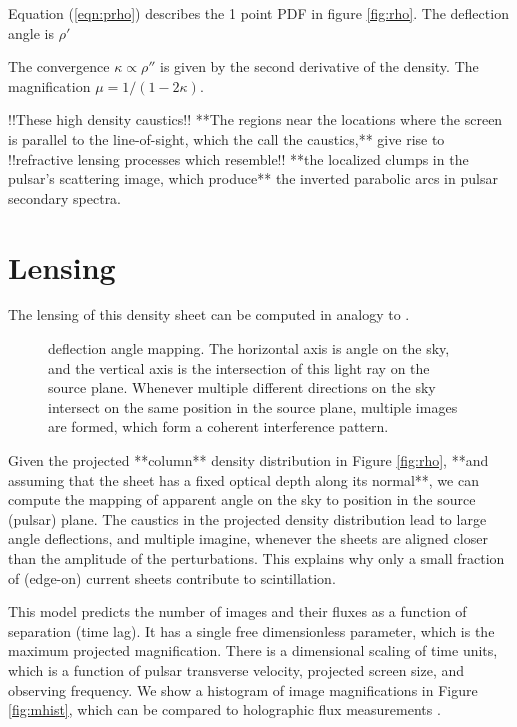 \documentclass[useAMS,usenatbib]{mn2e}
\begin{document}
Equation (\ref{eqn:prho}) describes the 1 point PDF in figure
\ref{fig:rho}.  The deflection angle is $\rho'$

The convergence $\kappa \propto \rho''$ is given by
the second derivative of the density.  The magnification
$\mu=1/(1-2\kappa)$.

!!These high density caustics!! **The regions near the locations where the screen is parallel
to the line-of-sight, which the call the caustics,** give rise to !!refractive lensing processes
which resemble!! **the localized clumps in the pulsar's scattering image, which
produce** the inverted parabolic arcs in pulsar secondary
spectra.

\section{Lensing}

The lensing of this density sheet can be computed in analogy to 
 \cite{2012MNRAS.421L.132P}.

\begin{figure}
\centerline{}
\caption{deflection angle mapping. The horizontal axis is angle on the
sky, and the vertical axis is the intersection of this light ray on
the source plane.  Whenever multiple different directions on the sky
intersect on the same position in the source plane, multiple images
are formed, which form a coherent interference pattern.}
\label{fig:dt}
\end{figure}

Given the projected **column** density distribution in Figure \ref{fig:rho}, **and assuming that
the sheet has a fixed optical depth along its normal**, we
can compute the mapping of apparent angle on the sky to position in the
source (pulsar) plane.  The caustics in the projected density
distribution lead to large angle deflections, and multiple imagine,
whenever the sheets are aligned closer than the amplitude of the
perturbations.  This explains why only a small fraction of (edge-on) current
sheets contribute to scintillation.

This model predicts the number of images and their fluxes as a
function of separation (time lag).  It has a single free dimensionless
parameter, which is the maximum projected magnification.  There is a
dimensional scaling of time units, which is a function of pulsar
transverse velocity, projected screen size, and observing frequency.
We show a histogram of image magnifications in Figure \ref{fig:mhist},
which can be compared to holographic flux measurements
\cite{2008MNRAS.388.1214W}.
\end{document}
